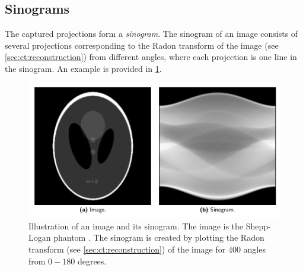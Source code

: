 \subsection{Sinograms}
\label{sec:ct:imagingmethod:sinograms}
The captured projections form a \textit{sinogram}. The sinogram of an image consists of several projections corresponding to the Radon transform of the image (see \cref{sec:ct:reconstruction}) from different angles, where each projection is one line in the sinogram. An example is provided in \cref{fig:sinogramshepplogan}. 

\begin{figure}[htbp]  
    \centering
    \includegraphics[width=.9\textwidth]{figures/sinogramshepplogan.pdf}
    \caption[Illustration of an image and a corresponding sinogram]{Illustration of an image and its sinogram. The image is the Shepp-Logan phantom \cite{6499235}. The sinogram is created by plotting the Radon transform (see \cref{sec:ct:reconstruction}) of the image for $400$ angles from $0-180$ degrees. }
    \label{fig:sinogramshepplogan}
\end{figure}

